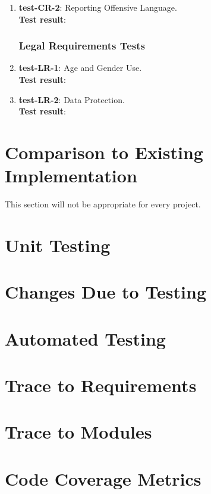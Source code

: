 \documentclass[12pt, titlepage]{article}
\begin{document}
\begin{enumerate}
	\item{\textbf{test-CR-2}}: Reporting Offensive Language.\\
	\textbf{Test result}:
	
\subsubsection{Legal Requirements Tests}
	\item{\textbf{test-LR-1}}: Age and Gender Use.\\
	\textbf{Test result}:
	
	\item{\textbf{test-LR-2}}: Data Protection.\\
	\textbf{Test result}:
	
\end{enumerate}
	
\section{Comparison to Existing Implementation}	

This section will not be appropriate for every project.

\section{Unit Testing}

\section{Changes Due to Testing}

\section{Automated Testing}
		
\section{Trace to Requirements}
		
\section{Trace to Modules}		

\section{Code Coverage Metrics}
\end{document}
